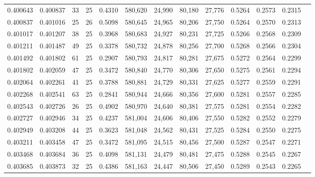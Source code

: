 \begin{tabular}{rrrrrrrrrrrrr}
0.400643 & 0.400837 &    33 &  25 &                                     0.4310 & 580,620 &  24,990 &  80,180 &  27,776 & 0.5264 & 0.2573 & 0.2315 \\
0.400837 & 0.401016 &    25 &  26 &                                     0.5098 & 580,645 &  24,965 &  80,206 &  27,750 & 0.5264 & 0.2570 & 0.2313 \\
0.401017 & 0.401207 &    38 &  25 &                                     0.3968 & 580,683 &  24,927 &  80,231 &  27,725 & 0.5266 & 0.2568 & 0.2309 \\
0.401211 & 0.401487 &    49 &  25 &                                     0.3378 & 580,732 &  24,878 &  80,256 &  27,700 & 0.5268 & 0.2566 & 0.2304 \\
0.401492 & 0.401802 &    61 &  25 &                                     0.2907 & 580,793 &  24,817 &  80,281 &  27,675 & 0.5272 & 0.2564 & 0.2299 \\
0.401802 & 0.402059 &    47 &  25 &                                     0.3472 & 580,840 &  24,770 &  80,306 &  27,650 & 0.5275 & 0.2561 & 0.2294 \\
0.402064 & 0.402261 &    41 &  25 &                                     0.3788 & 580,881 &  24,729 &  80,331 &  27,625 & 0.5277 & 0.2559 & 0.2291 \\
0.402268 & 0.402541 &    63 &  25 &                                     0.2841 & 580,944 &  24,666 &  80,356 &  27,600 & 0.5281 & 0.2557 & 0.2285 \\
0.402543 & 0.402726 &    26 &  25 &                                     0.4902 & 580,970 &  24,640 &  80,381 &  27,575 & 0.5281 & 0.2554 & 0.2282 \\
0.402727 & 0.402946 &    34 &  25 &                                     0.4237 & 581,004 &  24,606 &  80,406 &  27,550 & 0.5282 & 0.2552 & 0.2279 \\
0.402949 & 0.403208 &    44 &  25 &                                     0.3623 & 581,048 &  24,562 &  80,431 &  27,525 & 0.5284 & 0.2550 & 0.2275 \\
0.403211 & 0.403458 &    47 &  25 &                                     0.3472 & 581,095 &  24,515 &  80,456 &  27,500 & 0.5287 & 0.2547 & 0.2271 \\
0.403468 & 0.403684 &    36 &  25 &                                     0.4098 & 581,131 &  24,479 &  80,481 &  27,475 & 0.5288 & 0.2545 & 0.2267 \\
0.403685 & 0.403873 &    32 &  25 &                                     0.4386 & 581,163 &  24,447 &  80,506 &  27,450 & 0.5289 & 0.2543 & 0.2265 \\

\end{tabular}
